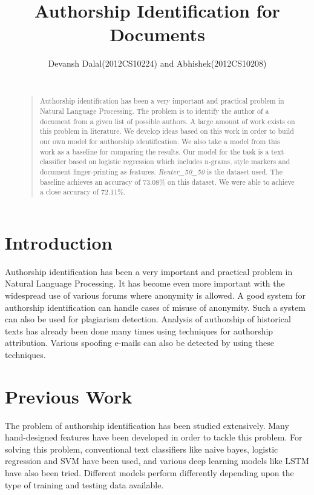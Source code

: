 \documentclass[letterpaper]{article}
\begin{document}
%
\title{Authorship Identification for Documents}
\author{
Devansh Dalal(2012CS10224)  and  Abhishek(2012CS10208)\\ 
\\
}


\maketitle
\begin{abstract}
\begin{quote}
Authorship identification has been a very important and practical problem in Natural Language Processing. The problem is to identify the author of a document from a given list of possible authors. A large amount of work exists on this problem in literature. We develop ideas based on this work in order to build our own model for authorship identification. We also take a model from this work as a baseline for comparing the results. Our model for the task is a text classifier based on logistic regression which includes n-grams, style markers and document finger-printing as features. \textit{Reuter\_50\_50} is the dataset used. The baseline achieves an accuracy of 73.08\% on this dataset. We were able to achieve a close accuracy of 72.11\%.
\end{quote}
\end{abstract}



\section{Introduction}
Authorship identification has been a very important and practical problem in Natural Language Processing. It has become even more important with the widespread use of various forums where anonymity is allowed. A good system for authorship identification can handle cases of misuse of anonymity. Such a system can also be used for plagiarism detection. Analysis of authorship of historical texts has already been done many times using techniques for authorship attribution. Various spoofing e-mails can also be detected by using these techniques.

\section{Previous Work}
The problem of authorship identification has been studied extensively. Many hand-designed features have been developed in order to tackle this problem. For solving this problem, conventional text classifiers like naive bayes, logistic regression and SVM have been used, and various deep learning models like LSTM have also been tried. Different models perform differently depending upon the type of training and testing data available.
\end{document}
